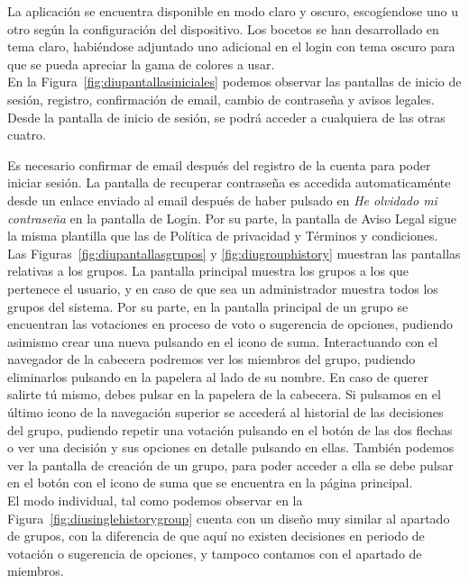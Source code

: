     La aplicación se encuentra disponible en modo claro y oscuro, escogíendose uno u otro según la configuración del dispositivo. Los bocetos se han desarrollado en tema claro, habiéndose adjuntado uno adicional en el login con tema oscuro para que se pueda apreciar la gama de colores a usar. \\

    En la Figura~\ref{fig:diupantallasiniciales} podemos observar las pantallas de inicio de sesión, registro, confirmación de email, cambio de contraseña y avisos legales. Desde la pantalla de inicio de sesión, se podrá acceder a cualquiera de las otras cuatro. 

    Es necesario confirmar de email después del registro de la cuenta para poder iniciar sesión. La pantalla de recuperar contraseña es accedida automaticaménte desde un enlace enviado al email después de haber pulsado en \textit{He olvidado mi contraseña} en la pantalla de Login. Por su parte, la pantalla de Aviso Legal sigue la misma plantilla que las de Política de privacidad y Términos y condiciones. \\

    Las Figuras~\ref{fig:diupantallasgrupos} y \ref{fig:diugrouphistory} muestran las pantallas relativas a los grupos. La pantalla principal muestra los grupos a los que pertenece el usuario, y en caso de que sea un administrador muestra todos los grupos del sistema. Por su parte, en la pantalla principal de un grupo se encuentran las votaciones en proceso de voto o sugerencia de opciones, pudiendo asimismo crear una nueva pulsando en el icono de suma. Interactuando con el navegador de la cabecera podremos ver los miembros del grupo, pudiendo eliminarlos pulsando en la papelera al lado de su nombre. En caso de querer salirte tú mismo, debes pulsar en la papelera de la cabecera. Si pulsamos en el último icono de la navegación superior se accederá al historial de las decisiones del grupo, pudiendo repetir una votación pulsando en el botón de las dos flechas o ver una decisión y sus opciones en detalle pulsando en ellas. También podemos ver la pantalla de creación de un grupo, para poder acceder a ella se debe pulsar en el botón con el icono de suma que se encuentra en la página principal. \\

    El modo individual, tal como podemos observar en la Figura~\ref{fig:diusinglehistorygroup} cuenta con un diseño muy similar al apartado de grupos, con la diferencia de que aquí no existen decisiones en periodo de votación o sugerencia de opciones, y tampoco contamos con el apartado de miembros. \\

